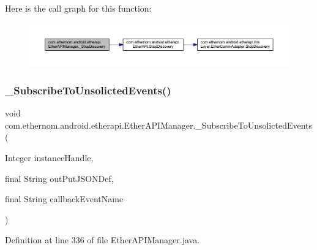 Here is the call graph for this function\+:\nopagebreak
\begin{figure}[H]
\begin{center}
\leavevmode
\includegraphics[width=350pt]{classcom_1_1ethernom_1_1android_1_1etherapi_1_1_ether_a_p_i_manager_af562559c5169777efdcb24b604a73a13_cgraph}
\end{center}
\end{figure}
\mbox{\label{classcom_1_1ethernom_1_1android_1_1etherapi_1_1_ether_a_p_i_manager_a1a142394e06213d21483ed176cd44bea}} 
\subsubsection{\texorpdfstring{\+\_\+\+Subscribe\+To\+Unsolicted\+Events()}{\_SubscribeToUnsolictedEvents()}}
{\footnotesize\ttfamily void com.\+ethernom.\+android.\+etherapi.\+Ether\+A\+P\+I\+Manager.\+\_\+\+Subscribe\+To\+Unsolicted\+Events (\begin{DoxyParamCaption}\item[{Integer}]{instance\+Handle,  }\item[{final String}]{out\+Put\+J\+S\+O\+N\+Def,  }\item[{final String}]{callback\+Event\+Name }\end{DoxyParamCaption})}



Definition at line 336 of file Ether\+A\+P\+I\+Manager.\+java.

